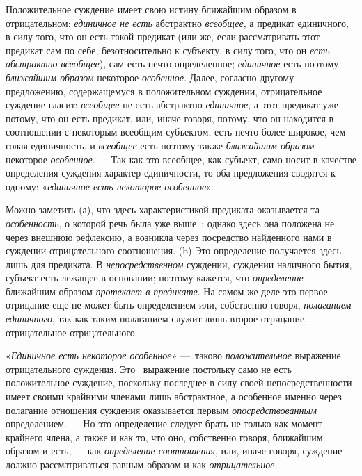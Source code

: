 \documentclass[twoside]{article}
\begin{document}
{{{Положительное суждение имеет свою истину ближайшим образом в
отрицательном: {\em единичное не есть}
абстрактно
{\em всеобщее}, а
предикат единичного, в силу того, что он есть такой предикат (или же, если
рассматривать этот предикат сам по себе, безотносительно к субъекту, в силу
того, что он {\em есть
абстрактно-всеобщее}), сам есть нечто определенное;
{\em единичное} есть
поэтому {\em ближайшим образом}
некоторое
{\em особенное}. Далее,
согласно другому предложению, содержащемуся в положительном суждении,
отрицательное суждение гласит:
{\em всеобщее} не есть
абстрактно {\em единичное},
а этот предикат уже потому, что он есть предикат, или, иначе
говоря, потому, что он находится в соотношении с некоторым всеобщим
субъектом, есть нечто более широкое, чем голая единичность, и
{\em всеобщее} есть
поэтому также {\em ближайшим образом}
некоторое
{\em особенное}. — Так
как это всеобщее, как субъект, само носит в качестве определения суждения
характер единичности, то оба предложения сводятся к одному:
«{\em единичное есть некоторое
особенное}».

Можно заметить (а), что здесь характеристикой предиката
оказывается та {\em особенность},
о которой речь была уже
выше~\label{bkm:bm34};
однако здесь она положена не через внешнюю рефлексию, а
возникла через посредство найденного нами в суждении отрицательного
соотношения. (b) Это определение получается здесь лишь для предиката. В
{\em непосредственном}
суждении, суждении наличного бытия, субъект есть лежащее в
основании; поэтому кажется, что
{\em определение}
ближайшим образом
{\em протекает в предикате}.
На самом же деле это первое отрицание еще не может быть
определением или, собственно говоря,
{\em полаганием единичного},
так как таким полаганием служит лишь второе отрицание,
отрицательное отрицательного.

«{\em Единичное есть некоторое
особенное}» —~таково
{\em положительное}
выражение отрицательного суждения. Это
\ выражение постольку само не есть положительное суждение,
поскольку последнее в силу своей непосредственности имеет своими крайними
членами лишь абстрактное, а особенное именно через полагание отношения
суждения оказывается первым
{\em опосредствованным}
определением. — Но это определение следует
брать не только как момент крайнего члена, а также и как то, что оно,
собственно говоря, ближайшим образом и есть, — как
{\em определение соотношения},
или, иначе говоря, суждение должно рассматриваться равным
образом и как {\em отрицательное}.

}}}
\end{document}
